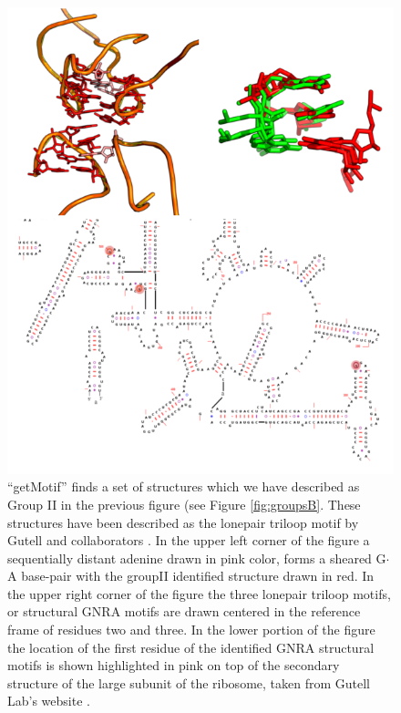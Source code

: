 \begin{figure}
\centering 
\includegraphics[angle=0, scale=2.5]{Chapter5/lonepairtlooptert.png}
\caption{``getMotif''  finds  a  set   of  structures  which  we  have
  described  as   Group  II  in   the  previous  figure   (see  Figure
  \ref{fig:groupsB}.  These structures have been
  described as the lonepair  triloop motif by Gutell and collaborators
  \cite{lee2003}.  In   the  upper  left   corner  of  the   figure  a
  sequentially distant  adenine drawn in  pink color, forms  a sheared
  G$\cdot$A base-pair  with the groupII identified  structure drawn in
  red.  In the upper  right corner  of the  figure the  three lonepair
  triloop motifs, or structural GNRA  motifs are drawn centered in the
  reference frame of  residues two and three. In  the lower portion of
  the figure the location of  the first residue of the identified GNRA
  structural  motifs  is shown  highlighted  in  pink  on top  of  the
  secondary structure of the large subunit of the ribosome, taken from
  Gutell Lab's website \cite{cannone2002}.
}
\label{fig:terts}
\end{figure}

